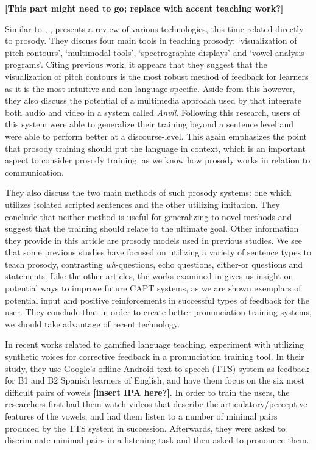 \documentclass
[
    a4paper,
    twoside,
    12pt
]
{report}
\begin{document}
\textbf{{[}This part might need to go; replace with accent teaching
work?{]}}

Similar to \textcite{eskenazi2009}, \textcite{chun2008}, presents a
review of various technologies, this time related directly to prosody.
They discuss four main tools in teaching prosody: `visualization of
pitch contours', `multimodal tools', `spectrographic displays' and
`vowel analysis programs'. Citing previous work, it appears that they
suggest that the visualization of pitch contours is the most robust
method of feedback for learners as it is the most intuitive and
non-language specific. Aside from this however, they also discuss the
potential of a multimedia approach used by \textcite{hardison2005} that
integrate both audio and video in a system called \textit{Anvil}.
Following this research, users of this system were able to generalize
their training beyond a sentence level and were able to perform better
at a discourse-level. This again emphasizes the point that prosody
training should put the language in context, which is an important
aspect to consider prosody training, as we know how prosody works in
relation to communication.

They also discuss the two main methods of such prosody systems: one
which utilizes isolated scripted sentences and the other utilizing
imitation. They conclude that neither method is useful for generalizing
to novel methods and suggest that the training should relate to the
ultimate goal. Other information they provide in this article are
prosody models used in previous studies. We see that some previous
studies have focused on utilizing a variety of sentence types to teach
prosody, contrasting \textit{wh}-questions, echo questions, either-or
questions and statements. Like the other articles, the works examined in
\textcite{chun2008} gives us insight on potential ways to improve future
CAPT systems, as we are shown exemplars of potential input and positive
reinforcements in successful types of feedback for the user. They
conclude that in order to create better pronunciation training systems,
we should take advantage of recent technology.

In recent works related to gamified language teaching,
\parencite{tejedor-garcia2017} experiment with utilizing synthetic
voices for corrective feedback in a pronunciation training tool. In
their study, they use Google's offline Android text-to-speech (TTS)
system as feedback for B1 and B2 Spanish learners of English, and have
them focus on the six most difficult pairs of vowels \textbf{{[}insert
IPA here?{]}}. In order to train the users, the researchers first had
them watch videos that describe the articulatory/perceptive features of
the vowels, and had them listen to a number of minimal pairs produced by
the TTS system in succession. Afterwards, they were asked to
discriminate minimal pairs in a listening task and then asked to
pronounce them.
\end{document}
